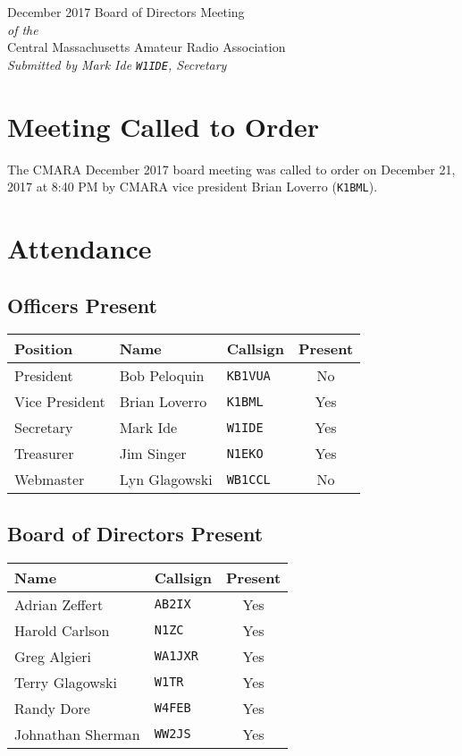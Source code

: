 \documentclass[10pt,letterpaper]{article}
\begin{document}
\begin{center}
{\huge December 2017 Board of Directors Meeting}\\
\emph{of the}\\
{\Large Central Massachusetts Amateur Radio Association}\\
\emph{Submitted by Mark Ide \texttt{W1IDE}, Secretary}
\end{center}

\section{Meeting Called to Order}
The CMARA December 2017 board meeting was called to order on December 21, 2017 at 8:40 PM by CMARA vice president Brian Loverro (\texttt{K1BML}).

\section{Attendance}

\subsection{Officers Present}
\begin{tabular}{|l|l|l|c|}
  \hline
  \textbf{Position} & \textbf{Name}  & \textbf{Callsign} & \textbf{Present} \\ \hline
  President         & Bob Peloquin   & \texttt{KB1VUA}   & No  \\
  Vice President    & Brian Loverro  & \texttt{K1BML}    & Yes \\
  Secretary         & Mark Ide       & \texttt{W1IDE}    & Yes \\
  Treasurer         & Jim Singer     & \texttt{N1EKO}    & Yes \\
  Webmaster         & Lyn Glagowski  & \texttt{WB1CCL}   & No  \\
  \hline
\end{tabular}

\subsection{Board of Directors Present}
\begin{tabular}{|l|l|c|}
  \hline
  \textbf{Name}     & \textbf{Callsign} & \textbf{Present} \\ \hline
  Adrian Zeffert    & \texttt{AB2IX}    & Yes \\
  Harold Carlson    & \texttt{N1ZC}     & Yes \\
  Greg Algieri      & \texttt{WA1JXR}   & Yes \\
  Terry Glagowski   & \texttt{W1TR}     & Yes \\
  Randy Dore        & \texttt{W4FEB}    & Yes \\
  Johnathan Sherman & \texttt{WW2JS}    & Yes \\
  \hline
\end{tabular}
\end{document}
